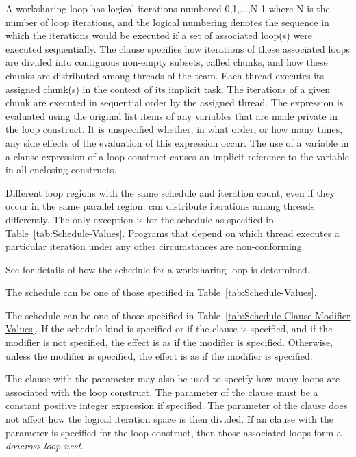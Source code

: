 A worksharing loop has logical iterations numbered 0,1,...,N-1 where N is the 
number of loop iterations, and the logical numbering denotes the sequence in 
which the iterations would be executed if a set of associated loop(s) were 
executed sequentially. The  clause specifies how iterations of 
these associated loops are divided into contiguous non-empty subsets, called 
chunks, and how these chunks are distributed among threads of the team. Each 
thread executes its assigned chunk(s) in the context of its implicit task. 
The iterations of a given chunk are executed in sequential order by the assigned thread.
The  expression is evaluated using the original list items of 
any variables that are made private in the loop construct. It is unspecified 
whether, in what order, or how many times, any side effects of the evaluation 
of this expression occur. The use of a variable in a  clause 
expression of a loop construct causes an implicit reference to the variable 
in all enclosing constructs.

Different loop regions with the same schedule and iteration count, even if 
they occur in the same parallel region, can distribute iterations among 
threads differently. The only exception is for the  schedule 
as specified in Table~\ref{tab:Schedule-Values}. Programs that depend 
on which thread executes a particular iteration under any other circumstances 
are non-conforming. 

See  
for details of how the schedule for a worksharing loop is 
determined. 

The schedule  can be one of those specified in 
Table~\ref{tab:Schedule-Values}.

The schedule  can be one of those specified in 
Table~\ref{tab:Schedule Clause Modifier Values}. If the 
 schedule kind is specified or if the  
clause is specified, and if the  modifier is 
not specified, the effect is as if the  modifier 
is specified. Otherwise, unless the  modifier is 
specified, the effect is as if the  modifier 
is specified.

The  clause with the parameter may also be used to specify 
how many loops are associated with the loop construct. The parameter of 
the  clause must be a constant positive integer expression
if specified. The parameter of the  clause does not
affect how the logical iteration space is then divided. If an  
clause with the parameter is specified for the loop construct, then those 
associated loops form a \emph{doacross loop nest}. 

